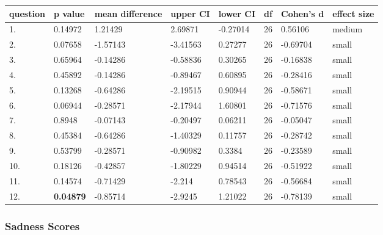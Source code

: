 \documentclass[11pt, twoside, reqno]{book}
\begin{document}
\begin{tabular}{|l|l|l|l|l|l|l|l|}
\hline
    question & p value & mean difference & upper CI & lower CI & df & Cohen's d & effect size  \\ \hline
    1. & 0.14972 & 1.21429 & 2.69871 & -0.27014 & 26 & 0.56106 & medium \\ \hline
    2. & 0.07658 & -1.57143 & -3.41563 & 0.27277 & 26 & -0.69704 & small \\ \hline
    3. & 0.65964 & -0.14286 & -0.58836 & 0.30265 & 26 & -0.16838 & small \\ \hline
    4. & 0.45892 & -0.14286 & -0.89467 & 0.60895 & 26 & -0.28416 & small \\ \hline
    5. & 0.13268 & -0.64286 & -2.19515 & 0.90944 & 26 & -0.58671 & small \\ \hline
    6. & 0.06944 & -0.28571 & -2.17944 & 1.60801 & 26 & -0.71576 & small \\ \hline
    7. & 0.8948 & -0.07143 & -0.20497 & 0.06211 & 26 & -0.05047 & small \\ \hline
    8. & 0.45384 & -0.64286 & -1.40329 & 0.11757 & 26 & -0.28742 & small \\ \hline
    9. & 0.53799 & -0.28571 & -0.90982 & 0.3384 & 26 & -0.23589 & small \\ \hline
    10. & 0.18126 & -0.42857 & -1.80229 & 0.94514 & 26 & -0.51922 & small \\ \hline
    11. & 0.14574 & -0.71429 & -2.214 & 0.78543 & 26 & -0.56684 & small \\ \hline
    12. & \textbf{0.04879} & -0.85714 & -2.9245 & 1.21022 & 26 & -0.78139 & small \\ \hline
\end{tabular}
\vspace{16pt}

\subsubsection{\textbf{Sadness Scores}}
\end{document}
